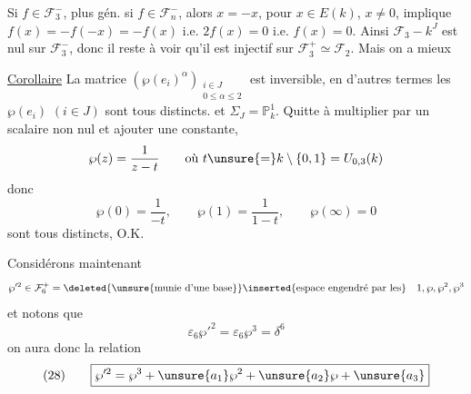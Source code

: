 Si $f\in\mathcal F_3^-$, plus gén. si $f\in\mathcal F_n^-$, alors
$x=-x$, pour $x\in E(k)$, $x\ne0$, implique $f(x)=-f(-x)=-f(x)$
i.e. $2f(x)=0$ i.e. $f(x)=0$. Ainsi $\mathcal F_3\mathbin{-}k^J$ est nul
sur $\mathcal F_3^-$, donc il reste à voir qu'il est
injectif sur $\mathcal F_3^+\simeq\mathcal F_2$. Mais on a mieux

\uline{Corollaire} La matrice 
$(\wp(e_i)^\alpha)_{\substack{i\in J\\0\leq\alpha\leq2}}$ est
inversible, en d'autres termes les $\wp(e_i)$ $(i\in J)$
sont tous distincts.
 
et $\Sigma_J=\mathbb P^1_k$. Quitte à multiplier par un
scalaire non nul et ajouter une constante,
\[
\wp(z)=\frac1{z-t}\qquad\text{où }t\unsure{=}k\setminus\{0,1\}=U_{0,3}(k)
\]
donc
\[
\wp(0)=\frac1{-t},\qquad\wp(1)=\frac1{1-t},\qquad\wp(\infty)=0
\]
sont tous distincts, O.K.

 Considérons maintenant
\[
\wp'^2\in\mathcal F_6^+=\deleted{\unsure{\text{munie d'une base}}}
\inserted{\text{espace engendré par les}} \quad1,\wp,\wp^2,\wp^3
\]
et notons que
\[
\varepsilon_6\wp'^2=\varepsilon_6\wp^3=\delta^6
\]
on aura donc la relation
\[
(28)\qquad\boxed{\wp'^2=\wp^3+\unsure{a_1}\wp^2+\unsure{a_2}\wp+\unsure{a_3}}
\]
